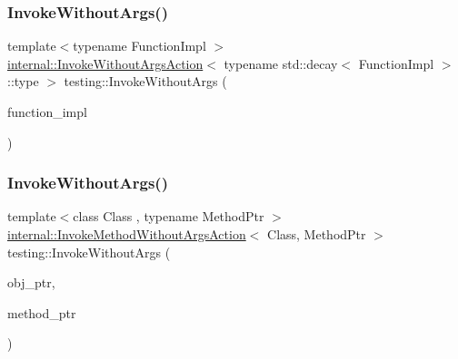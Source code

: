 \mbox{\label{namespacetesting_aabc08d610483908c8346f2e3318ad449}} 
\subsubsection{\texorpdfstring{InvokeWithoutArgs()}{InvokeWithoutArgs()}\hspace{0.1cm}{\footnotesize\ttfamily [1/4]}}
{\footnotesize\ttfamily template$<$typename Function\+Impl $>$ \\
\mbox{\hyperlink{structtesting_1_1internal_1_1_invoke_without_args_action}{internal\+::\+Invoke\+Without\+Args\+Action}}$<$ typename std\+::decay$<$ Function\+Impl $>$\+::type $>$ testing\+::\+Invoke\+Without\+Args (\begin{DoxyParamCaption}\item[{Function\+Impl}]{function\+\_\+impl }\end{DoxyParamCaption})}

\mbox{\label{namespacetesting_ab2961856113ff9af02fdf12c71b8a5f5}} 
\subsubsection{\texorpdfstring{InvokeWithoutArgs()}{InvokeWithoutArgs()}\hspace{0.1cm}{\footnotesize\ttfamily [2/4]}}
{\footnotesize\ttfamily template$<$class Class , typename Method\+Ptr $>$ \\
\mbox{\hyperlink{structtesting_1_1internal_1_1_invoke_method_without_args_action}{internal\+::\+Invoke\+Method\+Without\+Args\+Action}}$<$ Class, Method\+Ptr $>$ testing\+::\+Invoke\+Without\+Args (\begin{DoxyParamCaption}\item[{Class $\ast$}]{obj\+\_\+ptr,  }\item[{Method\+Ptr}]{method\+\_\+ptr }\end{DoxyParamCaption})}

\mbox{\label{namespacetesting_a88cc1999296bc630f6a49cdf66bb21f9}} 
